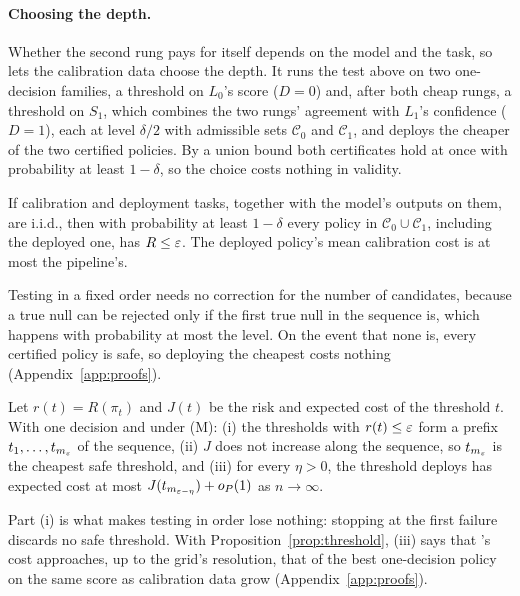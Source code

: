\paragraph{Choosing the depth.} Whether the second rung pays for itself depends on the model and the
task, so \climb{} lets the calibration data choose the depth. It runs the test above on two
one-decision families, a threshold on $L_0$'s score ($D = 0$) and, after both cheap rungs, a threshold on
$S_1$, which combines the two rungs' agreement with $L_1$'s confidence ($D = 1$), each at level $\delta/2$
with admissible sets $\mathcal{C}_0$ and $\mathcal{C}_1$, and deploys the cheaper of the two certified policies. By a union bound both
certificates hold at once with probability at least $1 - \delta$, so the choice costs nothing in
validity.

\begin{proposition}
\label{prop:risk}
If calibration and deployment tasks, together with the model's outputs on them, are i.i.d., then
with probability at least $1 - \delta$ every policy in $\mathcal{C}_0 \cup \mathcal{C}_1$, including the deployed one,
has $R \le \varepsilon$. The deployed policy's mean calibration cost is at most the pipeline's.
\end{proposition}

Testing in a fixed order needs no correction for the number of candidates, because a true null can be rejected
only if the first true null in the sequence is, which happens with probability at most the level. On the event that none is, every certified
policy is safe, so deploying the cheapest costs nothing (Appendix~\ref{app:proofs}).

\begin{proposition}[Efficiency]
\label{prop:efficiency}
Let $r(t) = R(\pi_t)$ and $J(t)$ be the risk and expected cost of the threshold $t$. With one decision and under (M):
(i) the thresholds with $r(t) \le \varepsilon$ form a prefix $t_1, \dots, t_{m_\varepsilon}$ of the sequence,
(ii) $J$ does not increase along the sequence, so $t_{m_\varepsilon}$ is the cheapest safe threshold, and
(iii) for every $\eta > 0$, the threshold \climb{} deploys has expected cost at most
$J(t_{m_{\varepsilon-\eta}}) + o_P(1)$ as $n \to \infty$.
\end{proposition}

Part (i) is what makes testing in order lose nothing: stopping at the first failure discards no safe
threshold. With Proposition~\ref{prop:threshold}, (iii) says that \climb{}'s cost approaches,
up to the grid's resolution, that of the best one-decision policy on the same score as calibration data grow (Appendix~\ref{app:proofs}).

